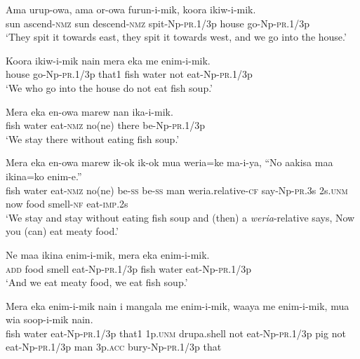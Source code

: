 \ea\label{ex:a:x15}
\gll  Ama  urup-owa,  ama  or-owa  furun-i-mik,  koora  ikiw-i-mik. \\
sun  ascend-\textsc{nmz}  sun  descend-\textsc{nmz}  spit-Np-\textsc{pr}.1/3p  house  go-Np-\textsc{pr}.1/3p \\
\glt ‘They spit it towards east, they spit it towards west, and we go into the house.’ \\
\z


\ea\label{ex:a:x16}
\gll  Koora  ikiw-i-mik  nain  mera  eka  me  enim-i-mik. \\
house  go-Np-\textsc{pr}.1/3p  that1  fish  water  not  eat-Np-\textsc{pr}.1/3p \\
\glt ‘We who go into the house do not eat fish soup.’ \\
\z


\ea\label{ex:a:x17}
\gll  Mera  eka  en-owa  marew  nan  ika-i-mik. \\
fish  water  eat-\textsc{nmz}  no(ne)  there  be-Np-\textsc{pr}.1/3p \\
\glt ‘We stay there without eating fish soup.’ \\
\z


\ea\label{ex:a:x18}
\gll  Mera  eka  en-owa  marew  ik-ok  ik-ok  mua  weria=ke  ma-i-ya,            “No  aakisa  maa  ikina=ko  enim-e.” \\
fish  water  eat-\textsc{nmz}  no(ne)  be-\textsc{ss}  be-\textsc{ss}  man  weria.relative-\textsc{cf}  say-Np-\textsc{pr}.3s 2s.\textsc{unm}  now  food  smell-\textsc{nf}  eat-\textsc{imp}.2s \\


\glt ‘We stay and stay without eating fish soup and (then) a \textit{weria}{}-relative says, Now you (can) eat meaty food.’ \\
\z


\ea\label{ex:a:x19}
\gll  Ne  maa  ikina  enim-i-mik,  mera  eka  enim-i-mik. \\
\textsc{add}  food  smell  eat-Np-\textsc{pr}.1/3p  fish  water  eat-Np-\textsc{pr}.1/3p \\
\glt ‘And we eat meaty food, we eat fish soup.’ \\
\z


\ea\label{ex:a:x20}
\gll  Mera  eka  enim-i-mik  nain  i  mangala  me  enim-i-mik,               waaya  me  enim-i-mik,  mua  wia  soop-i-mik  nain. \\
fish  water  eat-Np-\textsc{pr}.1/3p  that1  1p.\textsc{unm}  drupa.shell  not  eat-Np-\textsc{pr}.1/3p pig  not  eat-Np-\textsc{pr}.1/3p  man  3p.\textsc{acc}  bury-Np-\textsc{pr}.1/3p  that \\


